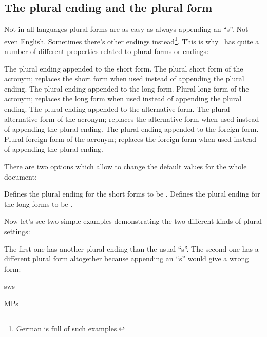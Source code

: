 \documentclass{acro-manual}
\begin{document}
\subsection{The plural ending and the plural form}\label{sec:plural-ending-form}
Not in all languages plural forms are as easy as always appending an
\enquote{s}.  Not even English.  Sometimes there's other endings
instead\footnote{German is full of such examples.}.  This is why \acro\ has
quite a number of different properties related to plural forms or endings:
\begin{properties}
    The plural ending appended to the short form.
  \Default
    The plural short form of the acronym; replaces the short form when used
    instead of appending the plural ending.
    The plural ending appended to the long form.
  \Default
    Plural long form of the acronym; replaces the long form when used
    instead of appending the plural ending.
    The plural ending appended to the alternative form.
  \Default
    The plural alternative form of the acronym; replaces the alternative form
    when used instead of appending the plural ending.
    The plural ending appended to the foreign form.
  \Default
    Plural foreign form of the acronym; replaces the foreign form when used
    instead of appending the plural ending.  
\end{properties}
There are two options which allow to change the default values for the whole
document:
\begin{options}
    Defines the plural ending for the short forms to be .
    Defines the plural ending for the long forms to be .
\end{options}
Now let's see two simple examples demonstrating the two different kinds of plural
settings:
\begin{sourcecode}
\end{sourcecode}
The first one has another plural ending than the usual \enquote{s}. The second
one has a different plural form altogether because appending an \enquote{s}
would give a wrong form:
\begin{example}
  \acfp{sw} \par
  \acfp{MP}
\end{example}
\end{document}
